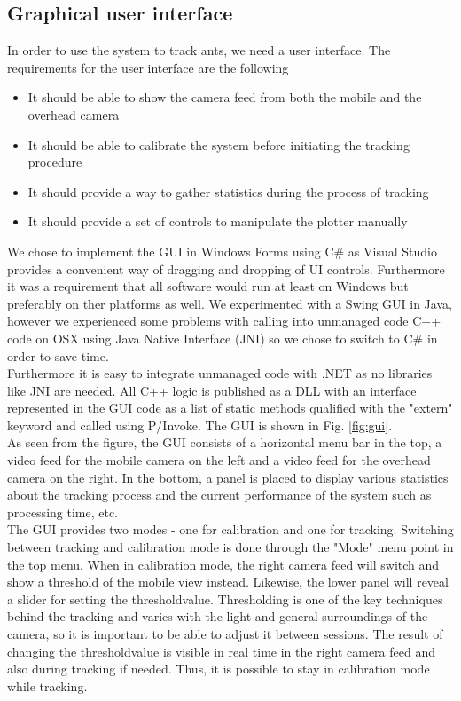 
\subsection{Graphical user interface}

In order to use the system to track ants, we need a user interface. The requirements for the user interface are the following

\begin{itemize}
  \item{It should be able to show the camera feed from both the mobile and the overhead camera}
  \item{It should be able to calibrate the system before initiating the tracking procedure}
  \item{It should provide a way to gather statistics during the process of tracking}
  \item{It should provide a set of controls to manipulate the plotter manually}
\end{itemize}

We chose to implement the GUI in Windows Forms using C\# as Visual Studio provides a convenient way of dragging and dropping of UI controls. Furthermore it was a requirement that all software would run at least on Windows but preferably on ther platforms as well. We experimented with a Swing GUI in Java, however we experienced some problems with calling into unmanaged code C++ code on OSX using Java Native Interface (JNI) so we chose to switch to C\# in order to save time. \\

Furthermore it is easy to integrate unmanaged code with .NET as no libraries like JNI are needed. All C++ logic is published as a DLL with an interface represented in the GUI code as a list of static methods qualified with the "extern" keyword and called using P/Invoke. The GUI is shown in Fig. \ref{fig:gui}. \\

As seen from the figure, the GUI consists of a horizontal menu bar in the top, a video feed for the mobile camera on the left and a video feed for the overhead camera on the right. In the bottom, a panel is placed to display various statistics about the tracking process and the current performance of the system such as processing time, etc. \\

The GUI provides two modes - one for calibration and one for tracking. Switching between tracking and calibration mode is done through the "Mode" menu point in the top menu. When in calibration mode, the right camera feed will switch and show a threshold of the mobile view instead. Likewise, the lower panel will reveal a slider for setting the thresholdvalue. Thresholding is one of the key techniques behind the tracking and varies with the light and general surroundings of the camera, so it is important to be able to adjust it between sessions. The result of changing the thresholdvalue is visible in real time in the right camera feed and also during tracking if needed. Thus, it is possible to stay in calibration mode while tracking. \\

